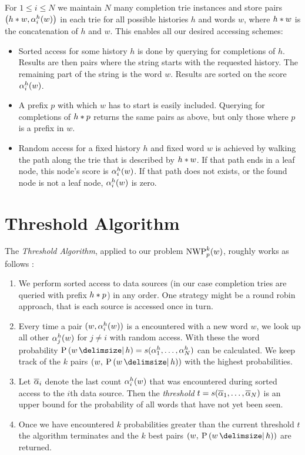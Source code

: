For $1 \leq i \leq N$ we maintain $N$ many completion trie instances and store
pairs $\left(h * w, \alpha^h_i(w)\right)$ in each trie for all possible
histories $h$ and words $w$, where $h * w$ is the concatenation of
$h$ and $w$.
This enables all our desired accessing schemes:
\begin{itemize}
  \item Sorted access for some history $h$ is done by querying for completions
    of $h$.
    Results are then pairs where the string starts with the requested
    history.
    The remaining part of the string is the word $w$.
    Results are sorted on the score $\alpha^h_i(w)$.
  \item A prefix $p$ with which $w$ has to start is easily included.
    Querying for completions of $h * p$ returns the same pairs as above, but only
    those where $p$ is a prefix in $w$.
  \item Random access for a fixed history $h$ and fixed word $w$ is achieved by
    walking the path along the trie that is described by $h * w$.
    If that path ends in a leaf node, this node's score is $\alpha^h_i(w)$.
    If that path does not exists, or the found node is not a leaf node,
    $\alpha^h_i(w)$ is zero.
\end{itemize}

\section{Threshold Algorithm}
\label{sec:thresholdalgorithm}

The \emph{Threshold Algorithm}, applied to our problem $\NWP[p][k](w)$, roughly
works as follows \parencite{Fagin2001}:
\begin{enumerate}
  \item We perform sorted access to data sources (in our case completion tries
    are queried with prefix $h * p$) in any order.
    One strategy might be a round robin approach, that is each source is
    accessed once in turn.
  \item Every time a pair $(w, \alpha^h_i(w))$ is a encountered with a new word
    $w$, we look up all other $\alpha^h_j(w)$ for $j \neq i$ with random
    access.
    With these the word probability
    $\Prob{w}{h} = s(\SumArg^h_1, \ldots, \SumArg^h_N)$ can be calculated.
    We keep track of the $k$ pairs $(w, \: \Prob{w}{h})$ with the highest
    probabilities.
  \item Let $\overline{\alpha}_i$ denote the last count $\alpha^h_i(w)$ that
    was encountered during sorted access to the $i$th data source.
    Then the \emph{threshold}
    $t = s(\overline{\alpha}_1, \ldots, \overline{\alpha}_N)$
    is an upper bound for the probability of all words that have not yet been
    seen.
  \item Once we have encountered $k$ probabilities greater than the current
    threshold $t$ the algorithm terminates and the $k$ best pairs
    $(w, \: \Prob{w}{h})$ are returned.
\end{enumerate}

